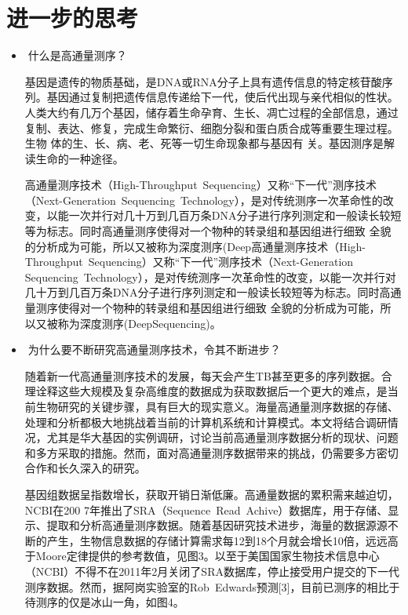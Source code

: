 \documentclass{article}
\begin{document}
\section{进一步的思考}
\begin{itemize}
    \item什么是高通量测序？\par
    基因是遗传的物质基础，是DNA或RNA分子上具有遗传信息的特定核苷酸序列。基因通过复制把遗传信息传递给下一代，使后代出现与亲代相似的性状。人类大约有几万个基因，储存着生命孕育、生长、凋亡过程的全部信息，通过复制、表达、修复，完成生命繁衍、细胞分裂和蛋白质合成等重要生理过程。生物 体的生、长、病、老、死等一切生命现象都与基因有 关。基因测序是解读生命的一种途径\citep{zhang}。\par
    高通量测序技术（High-Throughput Sequencing）又称“下一代”测序技术（Next-Generation Sequencing Technology），是对传统测序一次革命性的改变，以能一次并行对几十万到几百万条DNA分子进行序列测定和一般读长较短等为标志。同时高通量测序使得对一个物种的转录组和基因组进行细致 全貌的分析成为可能，所以又被称为深度测序(Deep高通量测序技术（High-Throughput Sequencing）又称“下一代”测序技术（Next-Generation Sequencing Technology），是对传统测序一次革命性的改变，以能一次并行对几十万到几百万条DNA分子进行序列测定和一般读长较短等为标志。同时高通量测序使得对一个物种的转录组和基因组进行细致 全貌的分析成为可能，所以又被称为深度测序(DeepSequencing)\citep{jiyin}。\par
    \item为什么要不断研究高通量测序技术，令其不断进步？\par
    随着新一代高通量测序技术的发展，每天会产生TB甚至更多的序列数据。合理诠释这些大规模及复杂高维度的数据成为获取数据后一个更大的难点，是当前生物研究的关键步骤，具有巨大的现实意义。海量高通量测序数据的存储、处理和分析都极大地挑战着当前的计算机系统和计算模式。本文将结合调研情况，尤其是华大基因的实例调研，讨论当前高通量测序数据分析的现状、问题和多方采取的措施。然而，面对高通量测序数据带来的挑战，仍需要多方密切合作和长久深入的研究。\par
    基因组数据呈指数增长，获取开销日渐低廉。高通量数据的累积需来越迫切，NCBI在200 7年推出了SRA（Sequence Read Achive）数据库，用于存储、显示、提取和分析高通量测序数据。随着基因研究技术进步，海量的数据源源不断的产生，生物信息数据的存储计算需求每12到18个月就会增长10倍，远远高于Moore定律提供的参考数值，见图3。以至于美国国家生物技术信息中心（NCBI）不得不在2011年2月关闭了SRA数据库，停止接受用户提交的下一代测序数据。然而，据阿岗实验室的Rob Edwards预测[3]，目前已测序的相比于待测序的仅是冰山一角，如图4。
    

\end{itemize}
\end{document}
